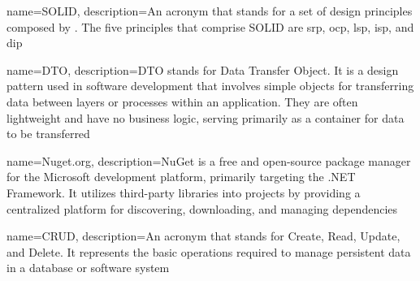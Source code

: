 


{ name=SOLID, description={An acronym that stands for a set of design principles
    composed by . The five
    principles that comprise SOLID are \acrlong*{srp}, \acrlong*{ocp}, \acrlong*{lsp},
    \acrlong*{isp}, and \acrlong*{dip}}}

{ name=DTO, description={DTO stands for Data Transfer Object. It is a design pattern used
    in software development that involves simple objects for transferring data between
    layers or processes within an application. They are often lightweight and have no
    business logic, serving primarily as a container for data to be transferred}}

{ name=Nuget.org, description={NuGet is a free and open-source package manager for the
    Microsoft development platform, primarily targeting the .NET Framework. It utilizes
    third-party libraries into projects by providing a centralized platform for
    discovering, downloading, and managing dependencies}}

{ name=CRUD, description={An acronym that stands for Create, Read, Update, and Delete. It
represents the basic operations required to manage persistent data in a database or
software system}}